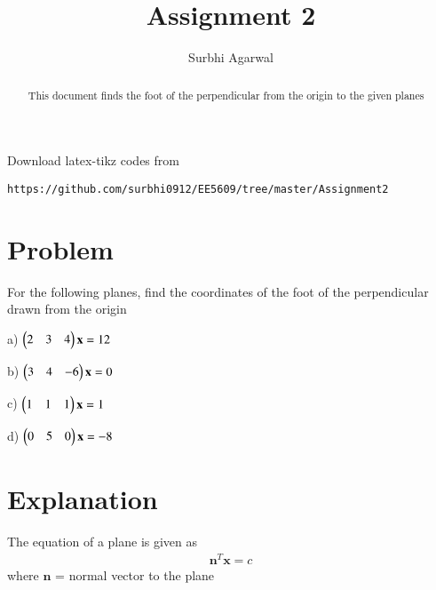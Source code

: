 \documentclass[journal,12pt,twocolumn]{IEEEtran}
\begin{document}
\let\StandardTheFigure\thefigure
\let\vec\mathbf

\renewcommand{\thefigure}{\theproblem}

\def\putbox#1#2#3{\makebox[0in][l]{\makebox[#1][l]{}\raisebox{\baselineskip}[0in][0in]{\raisebox{#2}[0in][0in]{#3}}}}
     \def\rightbox#1{\makebox[0in][r]{#1}}
     \def\centbox#1{\makebox[0in]{#1}}
     \def\topbox#1{\raisebox{-\baselineskip}[0in][0in]{#1}}
     \def\midbox#1{\raisebox{-0.5\baselineskip}[0in][0in]{#1}}
\vspace{3cm}

\title{Assignment 2}
\author{Surbhi Agarwal}

\maketitle

\newpage


\bigskip

\renewcommand{\thefigure}{\theenumi}
\renewcommand{\thetable}{\theenumi}

\begin{abstract}
This document finds the foot of the perpendicular from the origin to the given planes
\end{abstract}

Download latex-tikz codes from 
%
\begin{lstlisting}
https://github.com/surbhi0912/EE5609/tree/master/Assignment2
\end{lstlisting}
%
\section{Problem}
For the following planes, find the coordinates of the foot of the perpendicular drawn from the origin

a) $\myvec{2&3&4}\vec{x} = 12$

b) $\myvec{3&4&-6}\vec{x} = 0$

c) $\myvec{1&1&1}\vec{x} = 1$

d) $\myvec{0&5&0}\vec{x} = -8$
\section{Explanation}
The equation of a plane is given as
\begin{align}\label{e1}
    \vec{n}^T\vec{x} = c
\end{align}
where $\vec{n}$ = normal vector to the plane
\end{document}
